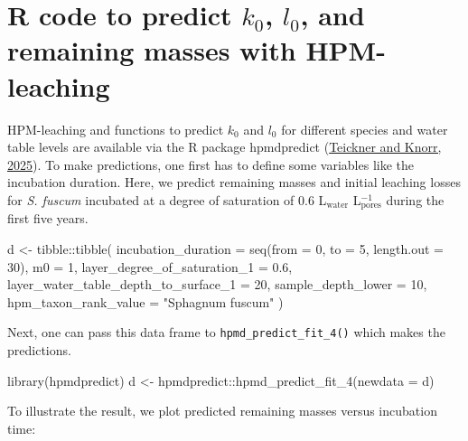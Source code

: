 \documentclass[
  12pt,
]{article}
\newenvironment{Shaded}{\begin{snugshade}}{\end{snugshade}}
\newcommand{\AttributeTok}[1]{\textcolor[rgb]{0.77,0.63,0.00}{#1}}
\newcommand{\DecValTok}[1]{\textcolor[rgb]{0.00,0.00,0.81}{#1}}
\newcommand{\FloatTok}[1]{\textcolor[rgb]{0.00,0.00,0.81}{#1}}
\newcommand{\FunctionTok}[1]{\textcolor[rgb]{0.00,0.00,0.00}{#1}}
\newcommand{\NormalTok}[1]{#1}
\newcommand{\OtherTok}[1]{\textcolor[rgb]{0.56,0.35,0.01}{#1}}
\newcommand{\SpecialCharTok}[1]{\textcolor[rgb]{0.00,0.00,0.00}{#1}}
\newcommand{\StringTok}[1]{\textcolor[rgb]{0.31,0.60,0.02}{#1}}
\begin{document}
\hypertarget{sup-7}{%
\section{\texorpdfstring{R code to predict \(k_0\), \(l_0\), and remaining masses with HPM-leaching}{R code to predict k\_0, l\_0, and remaining masses with HPM-leaching}}\label{sup-7}}

HPM-leaching and functions to predict \(k_0\) and \(l_0\) for different species and water table levels are available via the R package hpmdpredict (\protect\hyperlink{ref-Teickner.2025b}{Teickner and Knorr, 2025}). To make predictions, one first has to define some variables like the incubation duration. Here, we predict remaining masses and initial leaching losses for \emph{S. fuscum} incubated at a degree of saturation of 0.6 L\(_\text{water}\) L\(_\text{pores}^{-1}\) during the first five years.

\begin{Shaded}
\begin{Highlighting}[]
\NormalTok{d }\OtherTok{\textless{}{-}} 
\NormalTok{  tibble}\SpecialCharTok{::}\FunctionTok{tibble}\NormalTok{(}
    \AttributeTok{incubation\_duration =} \FunctionTok{seq}\NormalTok{(}\AttributeTok{from =} \DecValTok{0}\NormalTok{, }\AttributeTok{to =} \DecValTok{5}\NormalTok{, }\AttributeTok{length.out =} \DecValTok{30}\NormalTok{),}
    \AttributeTok{m0 =} \DecValTok{1}\NormalTok{,}
    \AttributeTok{layer\_degree\_of\_saturation\_1 =} \FloatTok{0.6}\NormalTok{,}
    \AttributeTok{layer\_water\_table\_depth\_to\_surface\_1 =} \DecValTok{20}\NormalTok{,}
    \AttributeTok{sample\_depth\_lower =} \DecValTok{10}\NormalTok{,}
    \AttributeTok{hpm\_taxon\_rank\_value =} \StringTok{"Sphagnum fuscum"}
\NormalTok{  )}
\end{Highlighting}
\end{Shaded}

Next, one can pass this data frame to \texttt{hpmd\_predict\_fit\_4()} which makes the predictions.

\begin{Shaded}
\begin{Highlighting}[]
\FunctionTok{library}\NormalTok{(hpmdpredict)}
\NormalTok{d }\OtherTok{\textless{}{-}}\NormalTok{ hpmdpredict}\SpecialCharTok{::}\FunctionTok{hpmd\_predict\_fit\_4}\NormalTok{(}\AttributeTok{newdata =}\NormalTok{ d)}
\end{Highlighting}
\end{Shaded}

To illustrate the result, we plot predicted remaining masses versus incubation time:
\end{document}
